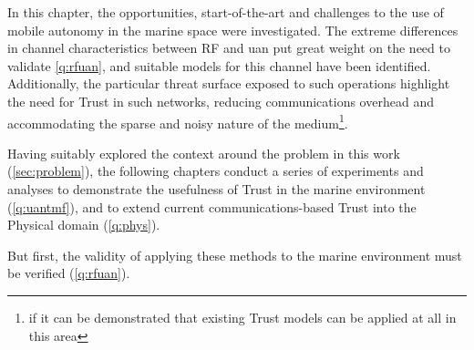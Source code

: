 In this chapter, the opportunities, start-of-the-art and challenges to the use of mobile autonomy in the marine space were investigated.
The extreme differences in channel characteristics between RF and \gls{uan} put great weight on the need to validate \autoref{q:rfuan}, and suitable models for this channel have been identified.
Additionally, the particular threat surface exposed to such operations highlight the need for Trust in such networks, reducing communications overhead and accommodating the sparse and noisy nature of the medium\footnote{if it can be demonstrated that existing Trust models can be applied at all in this area}.

Having suitably explored the context around the problem in this work (\autoref{sec:problem}), the following chapters conduct a series of experiments and analyses to demonstrate the usefulness of Trust in the marine environment (\autoref{q:uantmf}), and to extend current communications-based Trust into the Physical domain (\autoref{q:phys}).

But first, the validity of applying these methods to the marine environment must be verified (\autoref{q:rfuan}).


